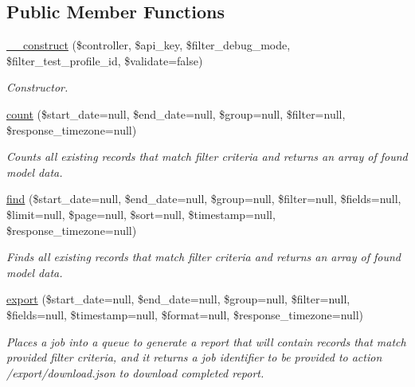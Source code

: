 \subsection*{Public Member Functions}
\begin{DoxyCompactItemize}
\item 
\hyperlink{classTune_1_1Management_1_1Reports_1_1ReportsActualsBase_a7081bd92319b21582ab740fbfc1e9e8c}{\-\_\-\-\_\-construct} (\$controller, \$api\-\_\-key, \$filter\-\_\-debug\-\_\-mode, \$filter\-\_\-test\-\_\-profile\-\_\-id, \$validate=false)
\begin{DoxyCompactList}\small\item\em Constructor. \end{DoxyCompactList}\item 
\hyperlink{classTune_1_1Management_1_1Reports_1_1ReportsActualsBase_a5a8067390a27e402555e878e28e4c54d}{count} (\$start\-\_\-date=null, \$end\-\_\-date=null, \$group=null, \$filter=null, \$response\-\_\-timezone=null)
\begin{DoxyCompactList}\small\item\em Counts all existing records that match filter criteria and returns an array of found model data. \end{DoxyCompactList}\item 
\hyperlink{classTune_1_1Management_1_1Reports_1_1ReportsActualsBase_ace658fea56b4819168acdc7dc2a2fc84}{find} (\$start\-\_\-date=null, \$end\-\_\-date=null, \$group=null, \$filter=null, \$fields=null, \$limit=null, \$page=null, \$sort=null, \$timestamp=null, \$response\-\_\-timezone=null)
\begin{DoxyCompactList}\small\item\em Finds all existing records that match filter criteria and returns an array of found model data. \end{DoxyCompactList}\item 
\hyperlink{classTune_1_1Management_1_1Reports_1_1ReportsActualsBase_aec0b383e43285612314c8ee141c0ebbf}{export} (\$start\-\_\-date=null, \$end\-\_\-date=null, \$group=null, \$filter=null, \$fields=null, \$timestamp=null, \$format=null, \$response\-\_\-timezone=null)
\begin{DoxyCompactList}\small\item\em Places a job into a queue to generate a report that will contain records that match provided filter criteria, and it returns a job identifier to be provided to action /export/download.json to download completed report. \end{DoxyCompactList}\end{DoxyCompactItemize}
